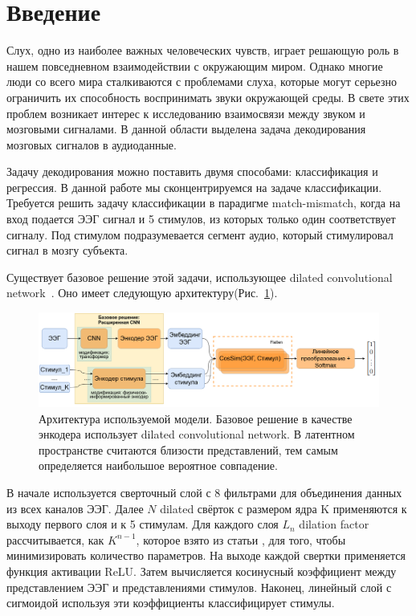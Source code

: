 \documentclass{article}
\begin{document}
\section{Введение} 
    \par 
    Слух, одно из наиболее важных человеческих чувств, играет решающую роль в нашем повседневном взаимодействии с окружающим миром. Однако многие люди со всего мира сталкиваются с проблемами слуха, которые могут серьезно ограничить их способность воспринимать звуки окружающей среды. В свете этих проблем возникает интерес к исследованию взаимосвязи между звуком и мозговыми сигналами. В данной области выделена задача декодирования мозговых сигналов в аудиоданные. 
    \par 
    Задачу декодирования можно поставить двумя способами: классификация и регрессия. В данной работе мы сконцентрируемся на задаче классификации. Требуется решить задачу классификации в парадигме match-mismatch, когда на вход подается ЭЭГ сигнал и 5 стимулов, из которых только один соответствует сигналу. Под стимулом подразумевается сегмент аудио, который стимулировал сигнал в мозгу субъекта. 
    \par 
    Существует базовое решение этой задачи, использующее dilated convolutional network~\citep{Accou2021ModelingTR}. Оно имеет следующую архитектуру(Рис.~\ref{model}).
    \begin{figure}
	\centering
	\includegraphics[width=1\textwidth]{model_architecture.png}
	\caption{Архитектура используемой модели. Базовое решение в качестве энкодера использует dilated convolutional network. В латентном пространстве считаются близости представлений, тем самым определяется наибольшое вероятное совпадение.}
	\label{model}
    \end{figure}
    В начале используется сверточный слой с 8 фильтрами для объединения данных из всех каналов ЭЭГ. Далее $N$ dilated свёрток с размером ядра K применяются к выходу первого слоя и к 5 стимулам. Для каждого слоя $L_n$ dilation factor рассчитывается, как $K^{n - 1}$, которое взято из статьи \citep{vandenoord16_ssw}, для того, чтобы минимизировать количество параметров. На выходе каждой свертки применяется функция активации ReLU. Затем вычисляется косинусный коэффициент между представлением ЭЭГ и представлениями стимулов. Наконец, линейный слой с сигмоидой используя эти коэффициенты классифицирует стимулы. 
\end{document}
